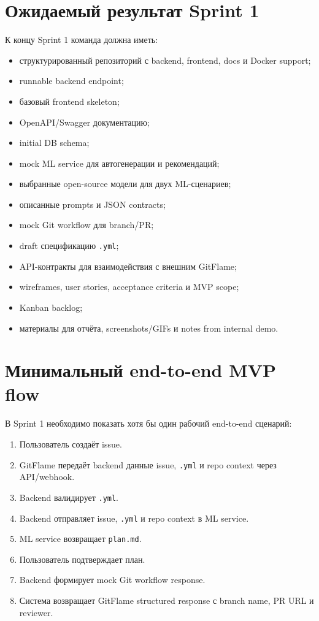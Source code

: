 \documentclass[12pt,a4paper]{article}
\begin{document}
\section{Ожидаемый результат Sprint 1}

К концу Sprint 1 команда должна иметь:

\begin{itemize}
    \item структурированный репозиторий с backend, frontend, docs и Docker support;
    \item runnable backend endpoint;
    \item базовый frontend skeleton;
    \item OpenAPI/Swagger документацию;
    \item initial DB schema;
    \item mock ML service для автогенерации и рекомендаций;
    \item выбранные open-source модели для двух ML-сценариев;
    \item описанные prompts и JSON contracts;
    \item mock Git workflow для branch/PR;
    \item draft спецификацию \texttt{.yml};
    \item API-контракты для взаимодействия с внешним GitFlame;
    \item wireframes, user stories, acceptance criteria и MVP scope;
    \item Kanban backlog;
    \item материалы для отчёта, screenshots/GIFs и notes from internal demo.
\end{itemize}

\section{Минимальный end-to-end MVP flow}

В Sprint 1 необходимо показать хотя бы один рабочий end-to-end сценарий:

\begin{enumerate}
    \item Пользователь создаёт issue.
    \item GitFlame передаёт backend данные issue, \texttt{.yml} и repo context через API/webhook.
    \item Backend валидирует \texttt{.yml}.
    \item Backend отправляет issue, \texttt{.yml} и repo context в ML service.
    \item ML service возвращает \texttt{plan.md}.
    \item Пользователь подтверждает план.
    \item Backend формирует mock Git workflow response.
    \item Система возвращает GitFlame structured response с branch name, PR URL и reviewer.
\end{enumerate}
\end{document}
